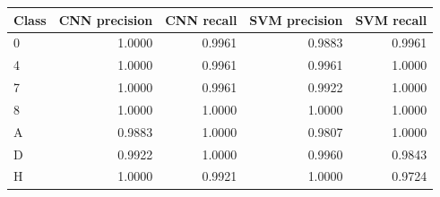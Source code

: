 \begin{center}\begin{tabular}{lrrrr}
\toprule
Class & CNN precision & CNN recall & SVM precision & SVM recall \\\midrule
0 & 1.0000 & 0.9961 & 0.9883 & 0.9961 \\
4 & 1.0000 & 0.9961 & 0.9961 & 1.0000 \\
7 & 1.0000 & 0.9961 & 0.9922 & 1.0000 \\
8 & 1.0000 & 1.0000 & 1.0000 & 1.0000 \\
A & 0.9883 & 1.0000 & 0.9807 & 1.0000 \\
D & 0.9922 & 1.0000 & 0.9960 & 0.9843 \\
H & 1.0000 & 0.9921 & 1.0000 & 0.9724 \\
\bottomrule\end{tabular}\end{center}
